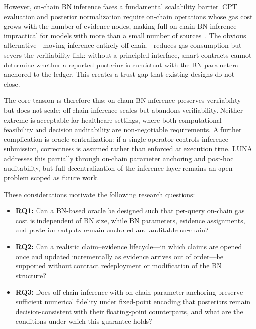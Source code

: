 \documentclass[journal]{IEEEtran}
\begin{document}
However, on-chain BN inference faces a fundamental
scalability barrier.
CPT evaluation and posterior normalization require
on-chain operations whose gas cost grows with the number
of evidence nodes, making full on-chain BN inference
impractical for models with more than a small number of
sources~\cite{bn-oracle}.
The obvious alternative---moving inference entirely
off-chain---reduces gas consumption but severs the
verifiability link: without a principled interface, smart
contracts cannot determine whether a reported posterior is
consistent with the BN parameters anchored to the ledger.
This creates a trust gap that existing designs do not
close.

The core tension is therefore this: on-chain BN inference
preserves verifiability but does not scale; off-chain
inference scales but abandons verifiability.
Neither extreme is acceptable for healthcare settings,
where both computational feasibility and decision
auditability are non-negotiable requirements.
A further complication is oracle centralization: if a
single operator controls inference submission, correctness
is assumed rather than enforced at execution time.
LUNA addresses this partially through on-chain parameter
anchoring and post-hoc auditability, but full
decentralization of the inference layer remains an open
problem scoped as future work.

These considerations motivate the following research
questions:

\begin{itemize}
  \item \textbf{RQ1:} Can a BN-based oracle be designed
  such that per-query on-chain gas cost is independent of
  BN size, while BN parameters, evidence assignments, and
  posterior outputs remain anchored and auditable on-chain?

  \item \textbf{RQ2:} Can a realistic claim--evidence
  lifecycle---in which claims are opened once and updated
  incrementally as evidence arrives out of order---be
  supported without contract redeployment or modification
  of the BN structure?

  \item \textbf{RQ3:} Does off-chain inference with
  on-chain parameter anchoring preserve sufficient
  numerical fidelity under fixed-point encoding that
  posteriors remain decision-consistent with their
  floating-point counterparts, and what are the conditions
  under which this guarantee holds?
\end{itemize}
\end{document}
